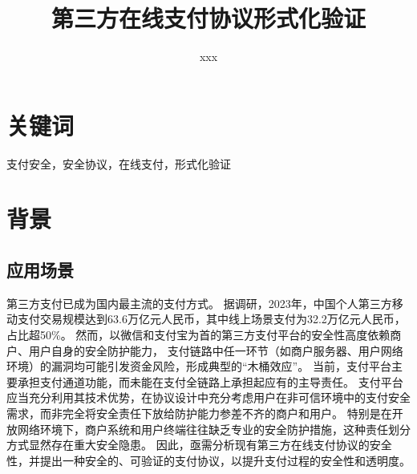 \documentclass[UTF8]{ctexart}
\title{第三方在线支付协议形式化验证}
\author{xxx}
\begin{document}
\maketitle
\section{关键词}
支付安全，安全协议，在线支付，形式化验证

\section{背景}
\subsection{应用场景}
第三方支付已成为国内最主流的支付方式。
据调研，2023年，中国个人第三方移动支付交易规模达到63.6万亿元人民币，其中线上场景支付为32.2万亿元人民币，占比超50\%\cite{Iresearch2024-report}。
然而，以微信和支付宝为首的第三方支付平台的安全性高度依赖商户、用户自身的安全防护能力，
支付链路中任一环节（如商户服务器、用户网络环境）的漏洞均可能引发资金风险，形成典型的``木桶效应''。
当前，支付平台主要承担支付通道功能，而未能在支付全链路上承担起应有的主导责任。
支付平台应当充分利用其技术优势，在协议设计中充分考虑用户在非可信环境中的支付安全需求，而非完全将安全责任下放给防护能力参差不齐的商户和用户。
特别是在开放网络环境下，商户系统和用户终端往往缺乏专业的安全防护措施，这种责任划分方式显然存在重大安全隐患。
因此，亟需分析现有第三方在线支付协议的安全性，并提出一种安全的、可验证的支付协议，以提升支付过程的安全性和透明度。 
\end{document}
